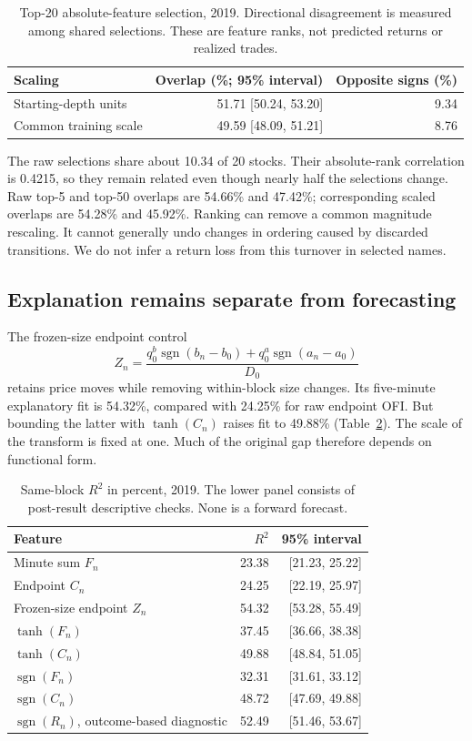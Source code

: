 \documentclass[11pt]{article}
\newcommand{\sgn}{\operatorname{sgn}}
\begin{document}
\begin{table}[htbp]
\centering
\caption{Top-20 absolute-feature selection, 2019. Directional disagreement is measured among shared selections. These are feature ranks, not predicted returns or realized trades.}
\label{tab:selection}
\begin{tabular}{lrr}
\toprule Scaling&Overlap (\%; 95\% interval)&Opposite signs (\%)\\\midrule
Starting-depth units&51.71 [50.24, 53.20]&9.34\\
Common training scale&49.59 [48.09, 51.21]&8.76\\\bottomrule
\end{tabular}
\end{table}

The raw selections share about 10.34 of 20 stocks. Their absolute-rank correlation is 0.4215, so they remain related even though nearly half the selections change. Raw top-5 and top-50 overlaps are 54.66\% and 47.42\%; corresponding scaled overlaps are 54.28\% and 45.92\%. Ranking can remove a common magnitude rescaling. It cannot generally undo changes in ordering caused by discarded transitions. We do not infer a return loss from this turnover in selected names.

\subsection{Explanation remains separate from forecasting}
The frozen-size endpoint control
\begin{equation}
 Z_n=\frac{q^b_0\sgn(b_n-b_0)+q^a_0\sgn(a_n-a_0)}{D_0}
\end{equation}
retains price moves while removing within-block size changes. Its five-minute explanatory fit is 54.32\%, compared with 24.25\% for raw endpoint OFI. But bounding the latter with $\tanh(C_n)$ raises fit to 49.88\% (Table~\ref{tab:fit}). The scale of the transform is fixed at one. Much of the original gap therefore depends on functional form.

\begin{table}[htbp]
\centering
\caption{Same-block $R^2$ in percent, 2019. The lower panel consists of post-result descriptive checks. None is a forward forecast.}
\label{tab:fit}
\begin{tabular}{lrr}
\toprule Feature&$R^2$&95\% interval\\\midrule
Minute sum $F_n$&23.38&[21.23, 25.22]\\
Endpoint $C_n$&24.25&[22.19, 25.97]\\
Frozen-size endpoint $Z_n$&54.32&[53.28, 55.49]\\\midrule
$\tanh(F_n)$&37.45&[36.66, 38.38]\\
$\tanh(C_n)$&49.88&[48.84, 51.05]\\
$\sgn(F_n)$&32.31&[31.61, 33.12]\\
$\sgn(C_n)$&48.72&[47.69, 49.88]\\
$\sgn(R_n)$, outcome-based diagnostic&52.49&[51.46, 53.67]\\\bottomrule
\end{tabular}
\end{table}
\end{document}

